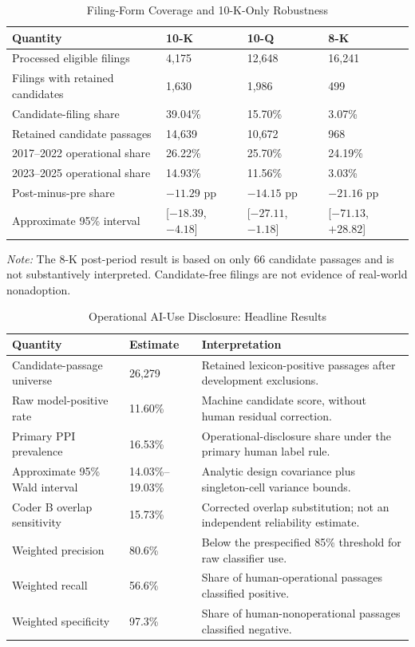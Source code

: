 \documentclass[12pt]{article}
\begin{document}
\begin{table}[htbp]
\centering
\caption{Filing-Form Coverage and 10-K-Only Robustness}
\label{tab:form_robustness}
\small
\begin{tabularx}{\textwidth}{@{}p{}p{}
  p{}X@{}}
\toprule
Quantity & 10-K & 10-Q & 8-K \\
\midrule
Processed eligible filings & 4,175 & 12,648 & 16,241 \\
Filings with retained candidates & 1,630 & 1,986 & 499 \\
Candidate-filing share & 39.04\% & 15.70\% & 3.07\% \\
Retained candidate passages & 14,639 & 10,672 & 968 \\
\midrule
2017--2022 operational share & 26.22\% & 25.70\% & 24.19\% \\
2023--2025 operational share & 14.93\% & 11.56\% & 3.03\% \\
Post-minus-pre share & $-11.29$ pp & $-14.15$ pp & $-21.16$ pp \\
Approximate 95\% interval & [$-18.39$, $-4.18$] &
[$-27.11$, $-1.18$] & [$-71.13$, $+28.82$] \\
\bottomrule
\end{tabularx}
\par\smallskip\footnotesize
\textit{Note:} The 8-K post-period result is based on only 66 candidate
passages and is not substantively interpreted. Candidate-free filings are not
evidence of real-world nonadoption.
\end{table}

\begin{table}[htbp]
\centering
\caption{Operational AI-Use Disclosure: Headline Results}
\label{tab:headline}
\small
\begin{tabularx}{\textwidth}{@{}p{}p{}X@{}}
\toprule
Quantity & Estimate & Interpretation \\
\midrule
Candidate-passage universe & 26,279 & Retained lexicon-positive passages after development exclusions. \\
Raw model-positive rate & 11.60\% & Machine candidate score, without human residual correction. \\
Primary PPI prevalence & 16.53\% & Operational-disclosure share under the primary human label rule. \\
Approximate 95\% Wald interval & 14.03\%--19.03\% & Analytic design covariance plus singleton-cell variance bounds. \\
Coder B overlap sensitivity & 15.73\% & Corrected overlap substitution; not an independent reliability estimate. \\
Weighted precision & 80.6\% & Below the prespecified 85\% threshold for raw classifier use. \\
Weighted recall & 56.6\% & Share of human-operational passages classified positive. \\
Weighted specificity & 97.3\% & Share of human-nonoperational passages classified negative. \\
\bottomrule
\end{tabularx}
\end{table}
\end{document}
